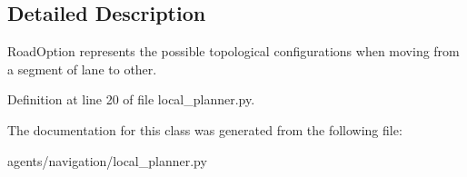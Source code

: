 \subsection{Detailed Description}
\begin{DoxyVerb}RoadOption represents the possible topological configurations when moving from a segment of lane to other.
\end{DoxyVerb}
 

Definition at line 20 of file local\+\_\+planner.\+py.



The documentation for this class was generated from the following file\+:\begin{DoxyCompactItemize}
\item 
agents/navigation/local\+\_\+planner.\+py\end{DoxyCompactItemize}
